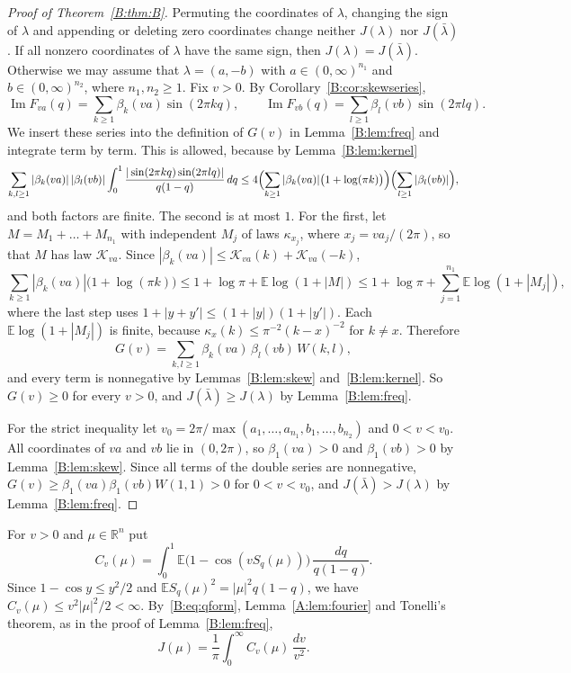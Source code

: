 \documentclass[11pt]{amsart}
\theoremstyle{remark}
\numberwithin{equation}{section}
\newcommand{\R}{\mathbb{R}}
\newcommand{\E}{\mathbb{E}}
\begin{document}
\begin{proof}[Proof of Theorem~\ref{B:thm:B}]
Permuting the coordinates of $\lambda$, changing the sign of $\lambda$ and appending or deleting zero coordinates change neither $J(\lambda)$ nor $J(\bar\lambda)$. If all nonzero coordinates of $\lambda$ have the same sign, then $J(\lambda)=J(\bar\lambda)$. Otherwise we may assume that $\lambda=(a,-b)$ with $a\in(0,\infty)^{n_1}$ and $b\in(0,\infty)^{n_2}$, where $n_1,n_2\ge1$. Fix $v>0$. By Corollary~\ref{B:cor:skewseries},
\[
\operatorname{Im}F_{va}(q)=\sum_{k\ge1}\beta_k(va)\sin(2\pi kq),\qquad \operatorname{Im}F_{vb}(q)=\sum_{l\ge1}\beta_l(vb)\sin(2\pi lq).
\]
We insert these series into the definition of $G(v)$ in Lemma~\ref{B:lem:freq} and integrate term by term. This is allowed, because by Lemma~\ref{B:lem:kernel}
\[
\sum_{k,l\ge1}|\beta_k(va)|\,|\beta_l(vb)|\int_0^1\frac{|\sin(2\pi kq)\sin(2\pi lq)|}{q(1-q)}\,dq\le4\Bigl(\sum_{k\ge1}|\beta_k(va)|\bigl(1+\log(\pi k)\bigr)\Bigr)\Bigl(\sum_{l\ge1}|\beta_l(vb)|\Bigr),
\]
and both factors are finite. The second is at most $1$. For the first, let $M=M_1+\dots+M_{n_1}$ with independent $M_j$ of laws $\kappa_{x_j}$, where $x_j=va_j/(2\pi)$, so that $M$ has law $\mathcal K_{va}$. Since $|\beta_k(va)|\le\mathcal K_{va}(k)+\mathcal K_{va}(-k)$,
\[
\sum_{k\ge1}|\beta_k(va)|\bigl(1+\log(\pi k)\bigr)\le1+\log\pi+\E\log(1+|M|)\le1+\log\pi+\sum_{j=1}^{n_1}\E\log(1+|M_j|),
\]
where the last step uses $1+|y+y'|\le(1+|y|)(1+|y'|)$. Each $\E\log(1+|M_j|)$ is finite, because $\kappa_x(k)\le\pi^{-2}(k-x)^{-2}$ for $k\ne x$. Therefore
\[
G(v)=\sum_{k,l\ge1}\beta_k(va)\,\beta_l(vb)\,W(k,l),
\]
and every term is nonnegative by Lemmas~\ref{B:lem:skew} and~\ref{B:lem:kernel}. So $G(v)\ge0$ for every $v>0$, and $J(\bar\lambda)\ge J(\lambda)$ by Lemma~\ref{B:lem:freq}.

For the strict inequality let $v_0=2\pi/\max(a_1,\dots,a_{n_1},b_1,\dots,b_{n_2})$ and $0<v<v_0$. All coordinates of $va$ and $vb$ lie in $(0,2\pi)$, so $\beta_1(va)>0$ and $\beta_1(vb)>0$ by Lemma~\ref{B:lem:skew}. Since all terms of the double series are nonnegative, $G(v)\ge\beta_1(va)\beta_1(vb)W(1,1)>0$ for $0<v<v_0$, and $J(\bar\lambda)>J(\lambda)$ by Lemma~\ref{B:lem:freq}.
\end{proof}

For $v>0$ and $\mu\in\R^n$ put
\begin{equation}\label{B:eq:Cv}
C_v(\mu)=\int_0^1\E\bigl(1-\cos(vS_q(\mu))\bigr)\,\frac{dq}{q(1-q)}.
\end{equation}
Since $1-\cos y\le y^2/2$ and $\E S_q(\mu)^2=|\mu|^2q(1-q)$, we have $C_v(\mu)\le v^2|\mu|^2/2<\infty$. By~\eqref{B:eq:qform}, Lemma~\ref{A:lem:fourier} and Tonelli's theorem, as in the proof of Lemma~\ref{B:lem:freq},
\begin{equation}\label{B:eq:JCv}
J(\mu)=\frac1\pi\int_0^\infty C_v(\mu)\,\frac{dv}{v^2}.
\end{equation}
\end{document}
